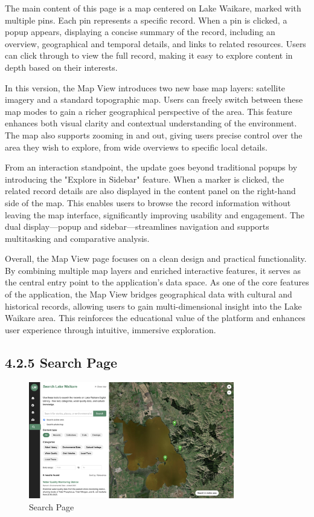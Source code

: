 The main content of this page is a map centered on Lake Waikare, marked with multiple pins. Each pin represents a specific record. When a pin is clicked, a popup appears, displaying a concise summary of the record, including an overview, geographical and temporal details, and links to related resources. Users can click through to view the full record, making it easy to explore content in depth based on their interests.

In this version, the Map View introduces two new base map layers: satellite imagery and a standard topographic map. Users can freely switch between these map modes to gain a richer geographical perspective of the area. This feature enhances both visual clarity and contextual understanding of the environment. The map also supports zooming in and out, giving users precise control over the area they wish to explore, from wide overviews to specific local details.

From an interaction standpoint, the update goes beyond traditional popups by introducing the "Explore in Sidebar" feature. When a marker is clicked, the related record details are also displayed in the content panel on the right-hand side of the map. This enables users to browse the record information without leaving the map interface, significantly improving usability and engagement. The dual display—popup and sidebar—streamlines navigation and supports multitasking and comparative analysis.

Overall, the Map View page focuses on a clean design and practical functionality. By combining multiple map layers and enriched interactive features, it serves as the central entry point to the application's data space. As one of the core features of the application, the Map View bridges geographical data with cultural and historical records, allowing users to gain multi-dimensional insight into the Lake Waikare area. This reinforces the educational value of the platform and enhances user experience through intuitive, immersive exploration.

\subsection*{4.2.5 Search Page}
\begin{figure}[H]
    \centering
    \includegraphics[width=0.8\textwidth]{screenshot/prototype_search.png}
    \caption{Search Page}
    \label{fig:architecture}
\end{figure}

